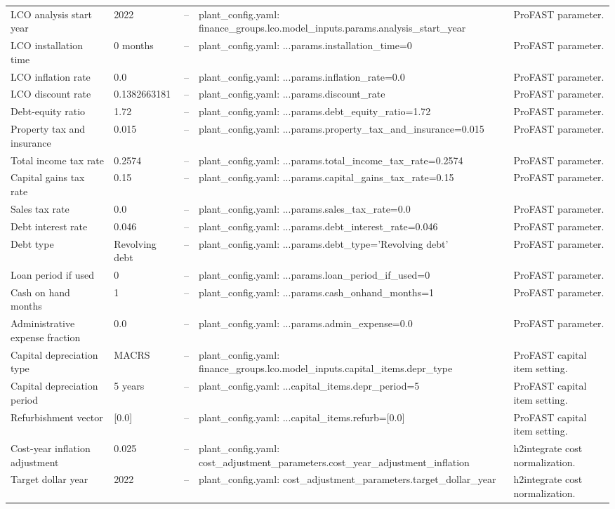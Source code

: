 \begin{center}
\begin{tabular}{L{0.16\textwidth} L{0.14\textwidth} L{0.22\textwidth} L{0.22\textwidth} L{0.20\textwidth}}
LCO analysis start year & 2022 & -- & plant\_config.yaml: finance\_groups.lco.model\_inputs.params.analysis\_start\_year & ProFAST parameter. \\
LCO installation time & 0 months & -- & plant\_config.yaml: ...params.installation\_time=0 & ProFAST parameter. \\
LCO inflation rate & 0.0 & -- & plant\_config.yaml: ...params.inflation\_rate=0.0 & ProFAST parameter. \\
LCO discount rate & 0.1382663181 & -- & plant\_config.yaml: ...params.discount\_rate & ProFAST parameter. \\
Debt-equity ratio & 1.72 & -- & plant\_config.yaml: ...params.debt\_equity\_ratio=1.72 & ProFAST parameter. \\
Property tax and insurance & 0.015 & -- & plant\_config.yaml: ...params.property\_tax\_and\_insurance=0.015 & ProFAST parameter. \\
Total income tax rate & 0.2574 & -- & plant\_config.yaml: ...params.total\_income\_tax\_rate=0.2574 & ProFAST parameter. \\
Capital gains tax rate & 0.15 & -- & plant\_config.yaml: ...params.capital\_gains\_tax\_rate=0.15 & ProFAST parameter. \\
Sales tax rate & 0.0 & -- & plant\_config.yaml: ...params.sales\_tax\_rate=0.0 & ProFAST parameter. \\
Debt interest rate & 0.046 & -- & plant\_config.yaml: ...params.debt\_interest\_rate=0.046 & ProFAST parameter. \\
Debt type & Revolving debt & -- & plant\_config.yaml: ...params.debt\_type='Revolving debt' & ProFAST parameter. \\
Loan period if used & 0 & -- & plant\_config.yaml: ...params.loan\_period\_if\_used=0 & ProFAST parameter. \\
Cash on hand months & 1 & -- & plant\_config.yaml: ...params.cash\_onhand\_months=1 & ProFAST parameter. \\
Administrative expense fraction & 0.0 & -- & plant\_config.yaml: ...params.admin\_expense=0.0 & ProFAST parameter. \\
Capital depreciation type & MACRS & -- & plant\_config.yaml: finance\_groups.lco.model\_inputs.capital\_items.depr\_type & ProFAST capital item setting. \\
Capital depreciation period & 5 years & -- & plant\_config.yaml: ...capital\_items.depr\_period=5 & ProFAST capital item setting. \\
Refurbishment vector & [0.0] & -- & plant\_config.yaml: ...capital\_items.refurb=[0.0] & ProFAST capital item setting. \\
Cost-year inflation adjustment & 0.025 & -- & plant\_config.yaml: cost\_adjustment\_parameters.cost\_year\_adjustment\_inflation & h2integrate cost normalization. \\
Target dollar year & 2022 & -- & plant\_config.yaml: cost\_adjustment\_parameters.target\_dollar\_year & h2integrate cost normalization. \\


\end{tabular}
\end{center}
